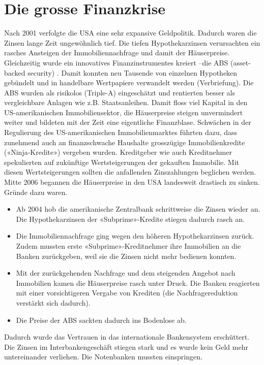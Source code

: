 \section{Die grosse Finanzkrise}
Nach 2001 verfolgte die USA eine sehr expansive Geldpolitik. Dadurch waren die Zinsen lange Zeit ungewöhnlich tief. Die tiefen Hypothekarzinsen verursachten ein rasches Ansteigen der Immobiliennachfrage und damit der Häuserpreise.
Gleichzeitig wurde ein innovatives Finanzinstrumentes kreiert –die ABS (asset-backed security) . Damit konnten neu Tausende von einzelnen Hypotheken gebündelt und in handelbare Wertpapiere verwandelt werden (Verbriefung). Die ABS wurden als risikolos (Triple-A) eingeschätzt und rentierten besser als vergleichbare Anlagen wie z.B. Staatsanleihen.
Damit floss viel Kapital in den US-amerikanischen Immobiliensektor, die Häuserpreise steigen unvermindert weiter und bildeten mit der Zeit eine eigentliche Finanzblase.
Schwächen in der Regulierung des US-amerikanischen Immobilienmarktes führten dazu, dass zunehmend auch an finanzschwache Haushalte grosszügige Immobilienkredite («Ninja-Kredite») vergeben wurden.
Kreditgeber wie auch Kreditnehmer spekulierten auf zukünftige Wertsteigerungen der gekauften Immobilie. Mit diesen Wertsteigerungen sollten die anfallenden Zinszahlungen beglichen werden.\\
Mitte 2006 begannen die Häuserpreise in den USA landesweit drastisch zu sinken. Gründe dazu waren. 
\begin{itemize}
	\item Ab 2004 hob die amerikanische Zentralbank schrittweise die Zinsen wieder an. Die Hypothekarzinsen der «Subprime»-Kredite stiegen dadurch rasch an.
	\item Die Immobiliennachfrage ging wegen den höheren Hypothekarzinsen zurück. Zudem mussten erste «Subprime»-Kreditnehmer ihre Immobilien an die Banken zurückgeben, weil sie die Zinsen nicht mehr bedienen konnten.
	\item Mit der zurückgehenden Nachfrage und dem steigenden Angebot nach Immobilien kamen die Häuserpreise rasch unter Druck. Die Banken reagierten mit einer vorsichtigeren Vergabe von Krediten (die Nachfragereduktion verstärkt sich dadurch).
	\item Die Preise der ABS sackten dadurch ins Bodenlose ab.
\end{itemize}
Dadurch wurde das Vertrauen in das internationale Bankensystem erschüttert. Die Zinsen im Interbankengeschäft stiegen stark und es wurde kein Geld mehr untereinander verliehen. Die Notenbanken mussten einspringen. 